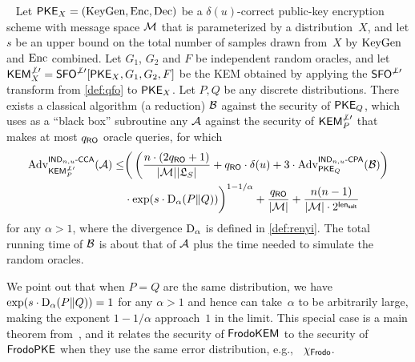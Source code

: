 \begin{theorem}\label{thm:cca-kem-to-cpa-pke-rom-parameterized}
  \ \newline
  Let $\textsf{\upshape\mdseries PKE}_X = (\textrm{\upshape\mdseries KeyGen},\textrm{\upshape\mdseries Enc},\textrm{\upshape\mdseries Dec})$ be a $\delta(u)$-correct public-key
  encryption scheme with message space $\mathcal{M}$ that is parameterized
  by a distribution~$X$, and let $s$ be an upper bound on the total
  number of samples drawn from~$X$ by $\textrm{\upshape\mdseries KeyGen}$ and $\textrm{\upshape\mdseries Enc}$ combined.
  Let $G_1$, $G_2$ and $F$ be independent random oracles, and let
  $\textsf{\upshape\mdseries KEM}^{\not\perp\prime}_X=\textsf{\upshape\mdseries SFO}^{\not\perp\prime}[\textsf{\upshape\mdseries PKE}_X,G_1,G_2,F]$ be the KEM
  obtained by applying the $\textsf{\upshape\mdseries SFO}^{\not\perp\prime}$ transform from
  \autoref{def:qfo} to $\textsf{\upshape\mdseries PKE}_{X}$. Let $P,Q$ be any discrete
  distributions. There exists a classical algorithm (a reduction)
  $\mathcal{B}$ against the \INDCPA security of $\textsf{\upshape\mdseries PKE}_Q$, which uses as
  a ``black box'' subroutine any $\mathcal{A}$ against the \INDCCA
  security of $\textsf{\upshape\mdseries KEM}^{\not\perp\prime}_P$ that makes at most $q_{\mathsf{RO}}$ oracle
  queries, for which
  \begin{align}
        \label{eq:cca-to-cpa-renyi-bound}
        \mathrm{Adv}^{\textsf{\upshape\mdseries \ensuremath{\textsf{\upshape\mdseries IND}_{n,u}\text{-}\textsf{\upshape\mdseries CCA}}}}_{\textsf{\upshape\mdseries KEM}^{\not\perp\prime}_P}(\mathcal{A}) \leq &
        \bigg( \left(
        \frac{n\cdot (2q_{\mathsf{RO}}+1)}{|\mathcal{M}||\mathfrak{L}_{S}|}
        + q_{\mathsf{RO}} \cdot \delta(u)
        + 3 \cdot\mathrm{Adv}^{\textsf{\upshape\mdseries \ensuremath{\textsf{\upshape\mdseries IND}_{n,u}\text{-}\textsf{\upshape\mdseries CPA}}}}_{\textsf{\upshape\mdseries PKE}_Q}(\mathcal{B}) \right) \nonumber \\
        & \cdot \exp(s \cdot \mathrm{D}_\alpha(P \| Q)) \bigg)^{1-1/\alpha}+\frac{q_{\mathsf{RO}}}{|\mathcal{M}|}+ \frac{n(n-1)}{|\mathcal{M}| \cdot 2^{{\mathsf{len}_{{\mathsf{salt}}}}}} 
  \end{align}
  for any $\alpha > 1$, where the \renyi divergence $\mathrm{D}_\alpha$ is defined in \autoref{def:renyi}.
  The total running time of $\mathcal{B}$ is about that of $\mathcal{A}$ plus the time needed to simulate the random oracles.
\end{theorem}

We point out that when $P=Q$ are the same distribution, we have
$\exp(s \cdot \mathrm{D}_{\alpha}(P \| Q)) = 1$ for any $\alpha > 1$ and
hence can take~$\alpha$ to be arbitrarily large, making the exponent
$1-1/\alpha$ approach~$1$ in the limit. This special case is a main
theorem from~\cite{TCC:HofHovKil17}, and it relates the \INDCCA
security of $\textsf{\upshape\mdseries FrodoKEM}$ to the \INDCPA security of $\textsf{\upshape\mdseries FrodoPKE}$ when
they use the same error distribution, e.g., ~$\chi_{\textsf{\upshape\mdseries Frodo}}$.

